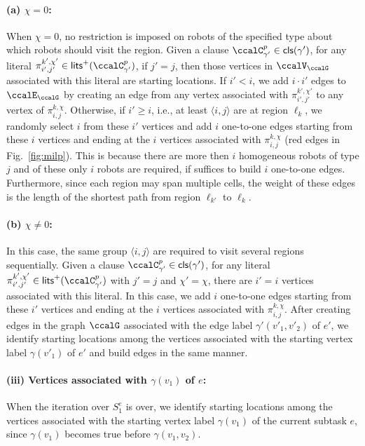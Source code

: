 \documentclass[Afour,sageh,times]{sagej}
\newcommand{\clause}[1]{\mathsf{cls}(#1)}
\newcommand{\ag}[2]{\langle#1,#2\rangle}
\renewcommand{\ap}[3]{\mathcal{\pi}_{{#1},{#2}}^{#3}}
\begin{document}
  \paragraph{\quad (a) $\chi = 0$:} When $\chi=0$, no restriction is imposed on robots of the specified type about which robots should visit the region.  Given a clause $\ccalC_{\gamma'}^p \in \clause{\gamma'}$, for any literal $\ap{i'}{j'}{k',\chi'} \in\mathsf{lits}^+(\ccalC_{\gamma'}^p)$, if $j'=j$, then those vertices in $\ccalV_\ccalG$ associated with this literal are starting locations. If $i'<i$, we add $i\cdot  i'$ edges to $\ccalE_\ccalG$ by creating an edge from any vertex associated with $\ap{i'}{j'}{k',\chi'}$ to any vertex of $\ap{i}{j}{k,\chi}$. Otherwise, if $i' \geq  i$, i.e., at least $\ag{i}{j}$ are at region $\ell_k$, we randomly select $i$ from these $i'$ vertices and add $i$ one-to-one edges starting from these $i$ vertices and ending at the $i$ vertices associated with $\ap{i}{j}{k,\chi}$ (red edges in Fig.~\ref{fig:milp}). This is because there are more then $i$ homogeneous robots of type $j$ and of these only $i$ robots are required, if suffices to build $i$ one-to-one edges. Furthermore, since each region may span multiple cells, the weight of these edges is the length of the shortest path from region  $\ell_{k'}$ to $\ell_k$. %
  \paragraph{\quad (b) $\chi \not=0$:} In this case, the same group $\ag{i}{j}$ are required to visit several regions sequentially.
  Given a clause $\ccalC_{\gamma'}^p \in \clause{\gamma'}$, for any literal $\ap{i'}{j'}{k',\chi'} \in\mathsf{lits}^+(\ccalC_{\gamma'}^p)$ with $j'=j$ and $\chi'=\chi$, there are $i'=i$ vertices associated with this literal. In this case, we add $i$ one-to-one edges starting from these $i'$ vertices and ending at the $i$ vertices associated with $\ap{i}{j}{k,\chi}$. After creating edges in the graph $\ccalG$ associated with the edge label  $\gamma'(v'_1,v'_2)$ of $e'$, we identify  starting locations among the vertices associated with the starting vertex label $\gamma(v'_1)$ of $e'$ and build edges in the same manner.
\paragraph{(iii) Vertices associated with $\gamma(v_1)$ of $e$:}\label{sec:c} When the iteration over $S_1^e$ is over, we identify  starting locations among the vertices associated with the starting vertex label  $\gamma(v_1)$ of the current subtask $e$, since $\gamma(v_1)$  becomes true before $\gamma(v_1, v_2)$.
\end{document}
